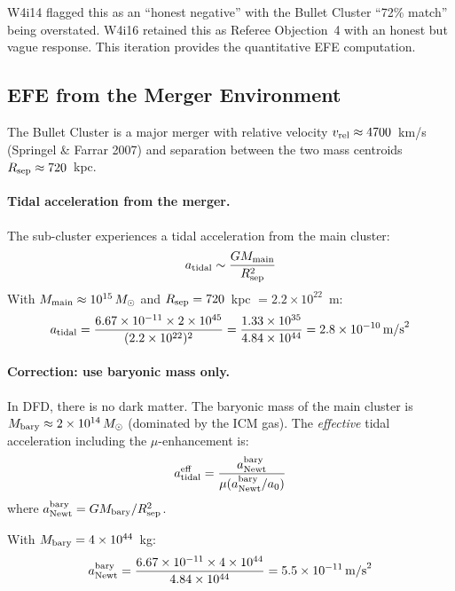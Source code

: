 \documentclass[11pt,a4paper]{article}
\newcommand{\ee}[1]{\times 10^{#1}}
\begin{document}
W4i14 flagged this as an ``honest negative'' with the Bullet Cluster
``72\% match'' being overstated.  W4i16 retained this as Referee
Objection~4 with an honest but vague response.  This iteration provides
the quantitative EFE computation.

\subsection{EFE from the Merger Environment}

The Bullet Cluster is a major merger with relative velocity
$v_{\rm rel} \approx 4700$~km/s (Springel \& Farrar 2007) and
separation between the two mass centroids $R_{\rm sep} \approx 720$~kpc.

\paragraph{Tidal acceleration from the merger.}
The sub-cluster experiences a tidal acceleration from the main cluster:
\begin{equation}
a_{\rm tidal} \sim \frac{GM_{\rm main}}{R_{\rm sep}^2}
\end{equation}
With $M_{\rm main} \approx 10^{15}\,M_\odot$ and
$R_{\rm sep} = 720$~kpc $= 2.2\ee{22}$~m:
\begin{equation}
a_{\rm tidal} = \frac{6.67\ee{-11} \times 2\ee{45}}{(2.2\ee{22})^2}
= \frac{1.33\ee{35}}{4.84\ee{44}} = 2.8\ee{-10}\,\text{m/s}^2
\end{equation}

\paragraph{Correction: use baryonic mass only.}
In DFD, there is no dark matter.  The baryonic mass of the main cluster
is $M_{\rm bary} \approx 2\ee{14}\,M_\odot$ (dominated by the ICM gas).
The \emph{effective} tidal acceleration including the $\mu$-enhancement is:
\begin{equation}
a_{\rm tidal}^{\rm eff} = \frac{a_{\rm Newt}^{\rm bary}}{\mu(a_{\rm Newt}^{\rm bary}/a_0)}
\end{equation}
where $a_{\rm Newt}^{\rm bary} = GM_{\rm bary}/R_{\rm sep}^2$.

With $M_{\rm bary} = 4\ee{44}$~kg:
\begin{equation}
a_{\rm Newt}^{\rm bary} = \frac{6.67\ee{-11} \times 4\ee{44}}{4.84\ee{44}}
= 5.5\ee{-11}\,\text{m/s}^2
\end{equation}
\end{document}

